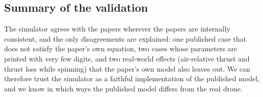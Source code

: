 \subsection{Summary of the validation}
\begin{plain}
The simulator agrees with the papers wherever the papers are internally consistent, and the only disagreements are explained: one published case that does not satisfy the paper's own equation, two cases whose parameters are printed with very few digits, and two real-world effects (air-relative thrust and thrust loss while spinning) that the paper's own model also leaves out. We can therefore trust the simulator as a faithful implementation of the published model, and we know in which ways the published model differs from the real drone.
\end{plain}
